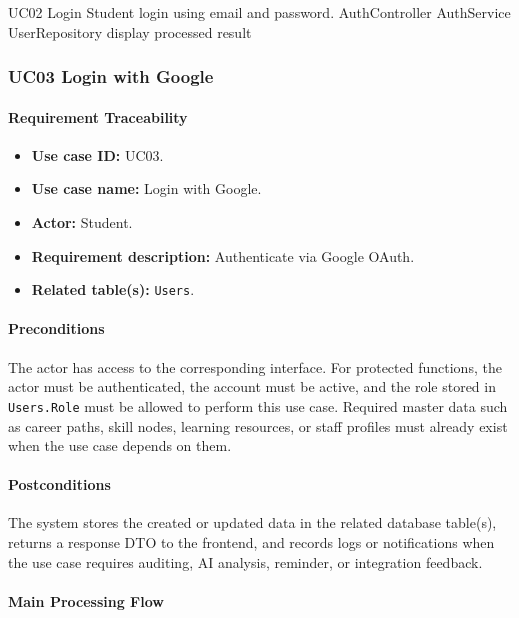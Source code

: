 \SequenceDiagram
{UC02 Login}
{Student}
{login using email and password.}
{AuthController}
{AuthService}
{UserRepository}
{display processed result}

\subsubsection{UC03 Login with Google}

\paragraph{Requirement Traceability}

\begin{itemize}
    \item \textbf{Use case ID:} UC03.
    \item \textbf{Use case name:} Login with Google.
    \item \textbf{Actor:} Student.
    \item \textbf{Requirement description:} Authenticate via Google OAuth.
    \item \textbf{Related table(s):} \texttt{Users}.
\end{itemize}

\paragraph{Preconditions}

The actor has access to the corresponding interface. For protected functions, the actor must be authenticated, the account must be active, and the role stored in \texttt{Users.Role} must be allowed to perform this use case. Required master data such as career paths, skill nodes, learning resources, or staff profiles must already exist when the use case depends on them.

\paragraph{Postconditions}

The system stores the created or updated data in the related database table(s), returns a response DTO to the frontend, and records logs or notifications when the use case requires auditing, AI analysis, reminder, or integration feedback.

\paragraph{Main Processing Flow}

